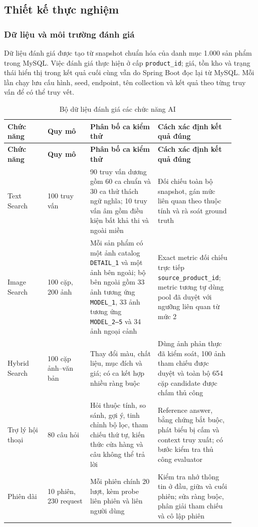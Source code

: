 \subsection{Thiết kế thực nghiệm}

\subsubsection{Dữ liệu và môi trường đánh giá}

Dữ liệu đánh giá được tạo từ snapshot chuẩn hóa của danh mục 1.000 sản phẩm trong MySQL. Việc đánh giá thực hiện ở cấp \texttt{product\_id}; giá, tồn kho và trạng thái hiển thị trong kết quả cuối cùng vẫn do Spring Boot đọc lại từ MySQL. Mỗi lần chạy lưu cấu hình, seed, endpoint, tên collection và kết quả theo từng truy vấn để có thể truy vết.

\begin{longtable}{|p{0.16\linewidth}|p{0.17\linewidth}|p{0.27\linewidth}|p{0.30\linewidth}|}
\caption{Bộ dữ liệu đánh giá các chức năng AI}\label{tab:eval-datasets}\\
\hline
\textbf{Chức năng} & \textbf{Quy mô} & \textbf{Phân bố ca kiểm thử} & \textbf{Cách xác định kết quả đúng} \\ \hline
\endfirsthead
\hline
\textbf{Chức năng} & \textbf{Quy mô} & \textbf{Phân bố ca kiểm thử} & \textbf{Cách xác định kết quả đúng} \\ \hline
\endhead
Text Search & 100 truy vấn & 90 truy vấn dương gồm 60 ca chuẩn và 30 ca thử thách ngữ nghĩa; 10 truy vấn âm gồm điều kiện bất khả thi và ngoài miền & Đối chiếu toàn bộ snapshot, gán mức liên quan theo thuộc tính và rà soát ground truth \\ \hline
Image Search & 100 cặp, 200 ảnh & Mỗi sản phẩm có một ảnh catalog \texttt{DETAIL\_1} và một ảnh bên ngoài; bộ bên ngoài gồm 33 ảnh tương ứng \texttt{MODEL\_1}, 33 ảnh tương ứng \texttt{MODEL\_2--5} và 34 ảnh ngoại cảnh & Exact metric đối chiếu trực tiếp \texttt{source\_product\_id}; metric tương tự dùng pool đã duyệt với ngưỡng liên quan từ mức 2 \\ \hline
Hybrid Search & 100 cặp ảnh--văn bản & Thay đổi màu, chất liệu, mục đích và giá; có ca kết hợp nhiều ràng buộc & Dùng ảnh phản thực đã kiểm soát, 100 ảnh tham chiếu được duyệt và toàn bộ 654 cặp candidate được chấm thủ công \\ \hline
Trợ lý hội thoại & 80 câu hỏi & Hỏi thuộc tính, so sánh, gợi ý, tinh chỉnh bộ lọc, tham chiếu thứ tự, kiến thức cửa hàng và câu không thể trả lời & Reference answer, bằng chứng bắt buộc, phát biểu bị cấm và context truy xuất; có bước kiểm tra thủ công evaluator \\ \hline
Phiên dài & 10 phiên, 230 request & Mỗi phiên chính 20 lượt, kèm probe liên phiên và liên người dùng & Kiểm tra nhớ thông tin ở đầu, giữa và cuối phiên; sửa ràng buộc, phân giải tham chiếu và cô lập phiên \\ \hline
\end{longtable}

